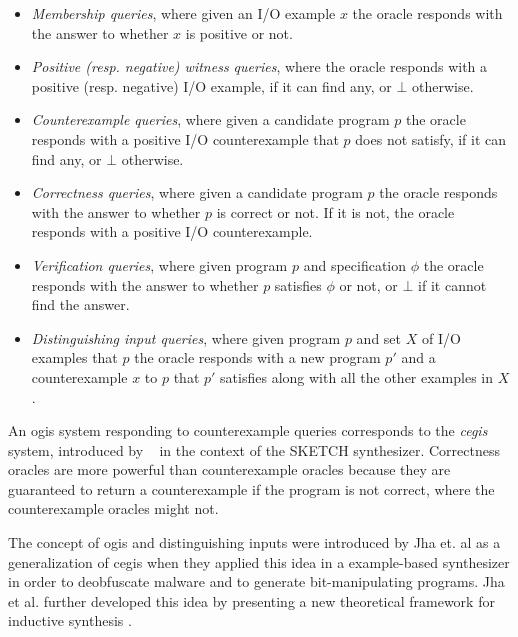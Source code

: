 \begin{itemize}
\item \textit{Membership queries}, where given an I/O example $x$ the oracle
  responds with the answer to whether $x$ is positive or not.
\item \textit{Positive (resp. negative) witness queries}, where the oracle
  responds with a positive (resp. negative) I/O example, if it can find any, or
  $\bot$ otherwise.
\item \textit{Counterexample queries}, where given a candidate program $p$ the
  oracle responds with a positive I/O counterexample that $p$ does not satisfy,
  if it can find any, or $\bot$ otherwise.
\item \textit{Correctness queries}, where given a candidate program $p$ the
  oracle responds with the answer to whether $p$ is correct or not. If it is not,
  the oracle responds with a positive I/O counterexample.
\item \textit{Verification queries}, where given program $p$ and specification
  $\phi$ the oracle responds with the answer to whether $p$ satisfies $\phi$ or
  not, or $\bot$ if it cannot find the answer.
\item \textit{Distinguishing input queries}, where given program $p$ and set $X$
  of I/O examples that $p$  the oracle responds with a new program $p'$ and a
  counterexample $x$ to $p$ that $p'$ satisfies along with all the other
  examples in $X$.
\end{itemize}

An \gls{ogis} system responding to counterexample queries corresponds to the
\textit{\gls{cegis}} system, introduced by \citeauthor{Solar-Lezama:2008}
~\cite{Solar-Lezama:2008} in the context of the SKETCH synthesizer. Correctness
oracles are more powerful than counterexample oracles because they are
guaranteed to return a counterexample if the program is not correct, where the
counterexample oracles might not.

The concept of \gls{ogis} and distinguishing inputs were introduced by Jha et.
al \cite{Jha:2017:TFS} as a generalization of \gls{cegis} when they applied
this idea in a example-based synthesizer in order to deobfuscate malware and to
generate bit-manipulating programs. Jha et al. further developed this idea by
presenting a new theoretical framework for inductive synthesis
\cite{Jha:2017:TFS}.


